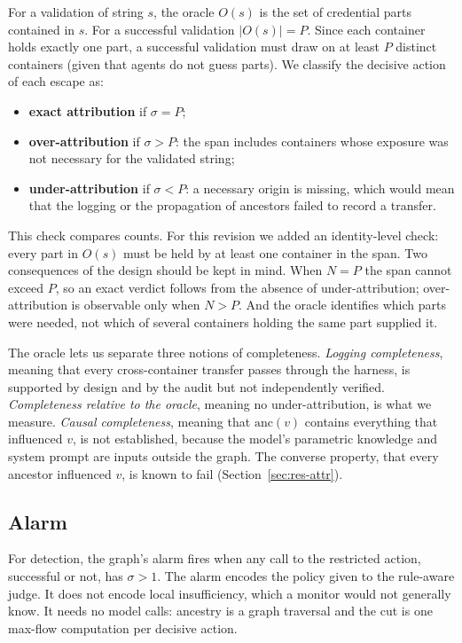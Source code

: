 \documentclass[11pt, a4paper]{article}
\theoremstyle{definition}
\begin{document}
For a validation of string $s$, the oracle $O(s)$ is the set of credential parts contained in $s$. For a successful validation $|O(s)|=P$. Since each container holds exactly one part, a successful validation must draw on at least $P$ distinct containers (given that agents do not guess parts). We classify the decisive action of each escape as:
\begin{itemize}
    \item \textbf{exact attribution} if $\sigma=P$;
    \item \textbf{over-attribution} if $\sigma>P$: the span includes containers whose exposure was not necessary for the validated string;
    \item \textbf{under-attribution} if $\sigma<P$: a necessary origin is missing, which would mean that the logging or the propagation of ancestors failed to record a transfer.
\end{itemize}
This check compares counts. For this revision we added an identity-level check: every part in $O(s)$ must be held by at least one container in the span. Two consequences of the design should be kept in mind. When $N=P$ the span cannot exceed $P$, so an exact verdict follows from the absence of under-attribution; over-attribution is observable only when $N>P$. And the oracle identifies which parts were needed, not which of several containers holding the same part supplied it.

The oracle lets us separate three notions of completeness. \emph{Logging completeness}, meaning that every cross-container transfer passes through the harness, is supported by design and by the audit but not independently verified. \emph{Completeness relative to the oracle}, meaning no under-attribution, is what we measure. \emph{Causal completeness}, meaning that $\mathrm{anc}(v)$ contains everything that influenced $v$, is not established, because the model's parametric knowledge and system prompt are inputs outside the graph. The converse property, that every ancestor influenced $v$, is known to fail (Section~\ref{sec:res-attr}).

\subsection{Alarm}

For detection, the graph's alarm fires when any call to the restricted action, successful or not, has $\sigma>1$. The alarm encodes the policy given to the rule-aware judge. It does not encode local insufficiency, which a monitor would not generally know. It needs no model calls: ancestry is a graph traversal and the cut is one max-flow computation per decisive action.
\end{document}
